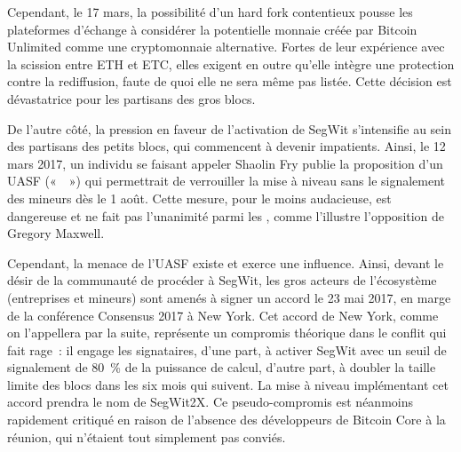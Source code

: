 Cependant, le 17 mars, la possibilité d'un hard fork contentieux pousse les plateformes d'échange à considérer la potentielle monnaie créée par Bitcoin Unlimited comme une cryptomonnaie alternative. Fortes de leur expérience avec la scission entre ETH et ETC, elles exigent en outre qu'elle intègre une protection contre la rediffusion, faute de quoi elle ne sera même pas listée. Cette décision est dévastatrice pour les partisans des gros blocs.

De l'autre côté, la pression en faveur de l'activation de SegWit s'intensifie au sein des partisans des petits blocs, qui commencent à devenir impatients. Ainsi, le 12 mars 2017, un individu se faisant appeler Shaolin Fry publie la proposition d'un UASF («~~») qui permettrait de verrouiller la mise à niveau sans le signalement des mineurs dès le 1\ier{} août. Cette mesure, pour le moins audacieuse, est dangereuse et ne fait pas l'unanimité parmi les , comme l'illustre l'opposition de Gregory Maxwell.

Cependant, la menace de l'UASF existe et exerce une influence. Ainsi, devant le désir de la communauté de procéder à SegWit, les gros acteurs de l'écosystème (entreprises et mineurs) sont amenés à signer un accord le 23 mai 2017, en marge de la conférence Consensus 2017 à New York. Cet accord de New York, comme on l'appellera par la suite, représente un compromis théorique dans le conflit qui fait rage~: il engage les signataires, d'une part, à activer SegWit avec un seuil de signalement de 80~\% de la puissance de calcul, d'autre part, à doubler la taille limite des blocs dans les six mois qui suivent. La mise à niveau implémentant cet accord prendra le nom de SegWit2X. Ce pseudo-compromis est néanmoins rapidement critiqué en raison de l'absence des développeurs de Bitcoin Core à la réunion, qui n'étaient tout simplement pas conviés.


